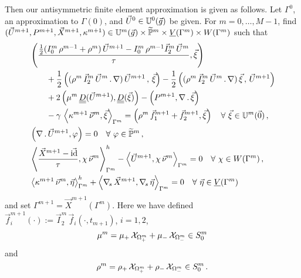 Then our antisymmetric finite element approximation is given as follows. Let
$\Gamma^0$, an approximation to $\Gamma(0)$, and $\vec U^0\in
\uspacedisc{g}{0}$ be given. For $m=0,\ldots, M-1$, find $(\vec U^{m+1},P^{m+1},
\vec X^{m+1}, \kappa^{m+1}) \in \uspacedisc{g}{m}\times \pnormspace^m \times
\Vh \times \Wh$ such that
\begin{subequations}
\begin{align}
& \left(\frac{\tfrac{1}{2}(I^m_0\,\rho^{m-1}+\rho^m)\,\vec U^{m+1} -
I^m_0\,\rho^{m-1} \vec I^m_2\,\vec U^m}{\tau}, \vec \xi \right)\nonumber \\
& \qquad + \frac{1}{2}\left((\rho^m\,\vec I^m_2\,\vec U^m\,.\,\nabla)\,
\vec U^{m+1}\,,\,\vec \xi \right) - \frac{1}{2} \left((\rho^m\,
\vec I^m_2 \, \vec U^m\,.\,\nabla)\,\vec \xi\,,\,\vec U^{m+1} \right)
\nonumber \\
& \qquad + 2\left(\mu^m\,\mat D(\vec U^{m+1}), \mat D(\vec \xi) \right)
- \left(P^{m+1}, \nabla\,.\,\vec \xi\right) \nonumber \\
& \qquad - \gamma\,\left\langle
\kappa^{m+1}\,\vec\nu^m,\vec\xi\right\rangle_{\Gamma^m}
= \left(\rho^m\,\vec f_1^{m+1}+\vec f_2^{m+1}, \vec \xi\right)
\quad \forall\ \vec\xi \in \uspacedisc{0}{m}\,,\label{eq:ns_HGa_antisym} \\
& \left(\nabla\,.\,\vec U^{m+1}, \varphi\right)  = 0
\quad \forall\ \varphi \in \pnormspace^m\,,\label{eq:ns_HGb_antisym} \\
&  \left\langle \frac{\vec X^{m+1} - \vec\id}{\tau} ,\chi\,\vec\nu^m
\right\rangle_{\Gamma^m}^h - \left\langle \vec U^{m+1}, \chi\,\vec\nu^m
\right\rangle_{\Gamma^m}  = 0 \quad \forall\ \chi \in \Wh\,,
\label{eq:ns_HGc_antisym}\\
& \left\langle \kappa^{m+1}\,\vec\nu^m, \vec\eta \right\rangle_{\Gamma^m}^h
+ \left\langle \nabs\,\vec X^{m+1}, \nabs\,\vec \eta \right\rangle_{\Gamma^m} =
0 \quad \forall\ \vec\eta \in \Vh \label{eq:ns_HGd_antisym}
\end{align}
\end{subequations}
and set $\Gamma^{m+1} = \vec X^{m+1}(\Gamma^m)$. Here we have defined
$\vec f_i^{m+1}(\cdot) := \vec I^m_2\,\vec f_i(\cdot,t_{m+1})$, $i=1,2$,
\begin{equation}
\mu^m = \mu_+\,\charfcn{\Omega^m_+} + \mu_-\,\charfcn{\Omega^m_-}\in S^m_0
\end{equation}
and
\begin{equation}
\rho^m = \rho_+\,\charfcn{\Omega^m_+} + \rho_-\,\charfcn{\Omega^m_-}\in S^m_0\,.
\end{equation}

